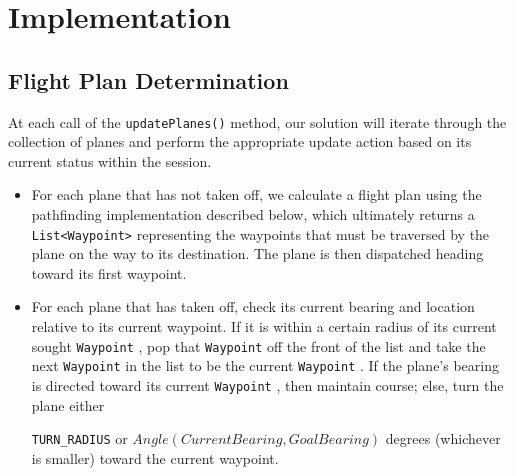 \documentclass[10pt]{article}
\newcommand{\ms}[1] {
  \texttt{#1}
}
\begin{document}
\newpage
\section{Implementation}

\subsection{Flight Plan Determination}
At each call of the \ms{updatePlanes()} method, our solution will iterate through the collection of 
planes and perform the appropriate update action based on its current status within the session.
\begin{itemize}
  \item For each plane that has not taken off, we calculate a flight plan using the pathfinding
    implementation described below, which ultimately returns a \ms{List<Waypoint>} representing the waypoints that must
    be traversed by the plane on the way to its destination. The plane is then dispatched heading toward
    its first waypoint.
  \item For each plane that has taken off, check its current bearing and location relative to its
    current waypoint. If it is within a certain radius of its current sought \ms{Waypoint}, pop that \ms{Waypoint} off
    the front of the list and take the next \ms{Waypoint} in the list to be the current \ms{Waypoint}. If the
    plane's bearing is directed toward its current \ms{Waypoint}, then maintain course; else, turn the plane either
    \ms{TURN\_RADIUS} or $Angle(Current Bearing, Goal Bearing)$ degrees (whichever is smaller) toward the current
    waypoint. 
\end{itemize}
    
\end{document}

